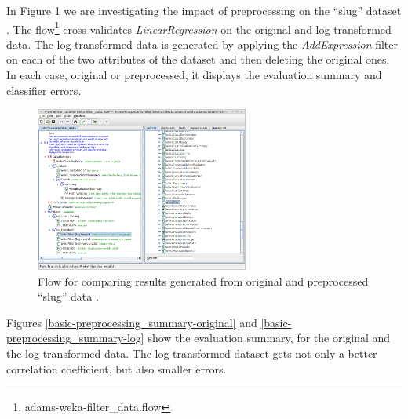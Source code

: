In Figure \ref{basic-preprocessing_flow} we are investigating the impact of
preprocessing on the ``slug'' dataset \cite{slug}. The
flow\footnote{adams-weka-filter\_data.flow} cross-validates
\textit{LinearRegression} on the original and log-transformed data. The
log-transformed data is generated by applying the \textit{AddExpression} filter
on each of the two attributes of the dataset and then deleting the original
ones. In each case, original or preprocessed, it displays the evaluation summary
and classifier errors.

\begin{figure}[htb]
  \centering
  \includegraphics[width=7.0cm]{images/basic-preprocessing_flow.png}
  \caption{Flow for comparing results generated from original and preprocessed
  ``slug'' data \cite{slug}.}
  \label{basic-preprocessing_flow}
\end{figure}

Figures \ref{basic-preprocessing_summary-original} and
\ref{basic-preprocessing_summary-log} show the evaluation summary, for the
original and the log-transformed data. The log-transformed dataset gets not
only a better correlation coefficient, but also smaller errors.

